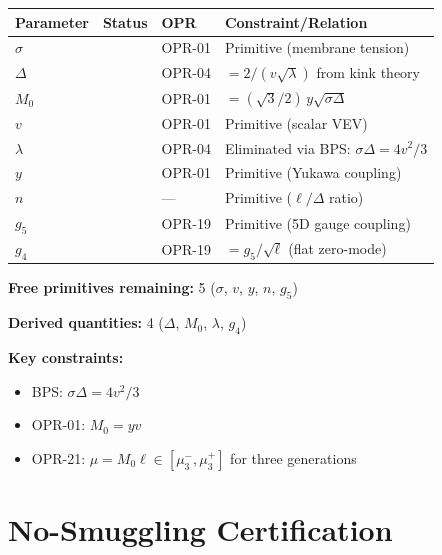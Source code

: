 \begin{tcolorbox}[colback=gray!5!white, colframe=gray!50!black,
    title=\textbf{Foundation Parameters: Closure Summary}]

\begin{center}
\renewcommand{\arraystretch}{1.3}
\begin{tabular}{llll}
\toprule
\textbf{Parameter} & \textbf{Status} & \textbf{OPR} & \textbf{Constraint/Relation} \\
\midrule
$\sigma$ & \tagP{} & OPR-01 & Primitive (membrane tension) \\
$\Delta$ & \tagDc{} & OPR-04 & $= 2/(v\sqrt{\lambda})$ from kink theory \\
$M_0$ & \tagDc{} & OPR-01 & $= (\sqrt{3}/2)\,y\sqrt{\sigma\Delta}$ \\
$v$ & \tagP{} & OPR-01 & Primitive (scalar VEV) \\
$\lambda$ & \tagDc{} & OPR-04 & Eliminated via BPS: $\sigma\Delta = 4v^2/3$ \\
$y$ & \tagP{} & OPR-01 & Primitive (Yukawa coupling) \\
$n$ & \tagP{} & --- & Primitive ($\ell/\Delta$ ratio) \\
$g_5$ & \tagP{} & OPR-19 & Primitive (5D gauge coupling) \\
$g_4$ & \tagDc{} & OPR-19 & $= g_5/\sqrt{\ell}$ (flat zero-mode) \\
\bottomrule
\end{tabular}
\end{center}

\medskip
\textbf{Free primitives remaining:} 5 ($\sigma$, $v$, $y$, $n$, $g_5$)

\textbf{Derived quantities:} 4 ($\Delta$, $M_0$, $\lambda$, $g_4$)

\textbf{Key constraints:}
\begin{itemize}[nosep]
\item BPS: $\sigma\Delta = 4v^2/3$
\item OPR-01: $M_0 = yv$
\item OPR-21: $\mu = M_0\ell \in [\mu_3^-, \mu_3^+]$ for three generations
\end{itemize}
\end{tcolorbox}

\section{No-Smuggling Certification}
\label{sec:no_smuggling}

